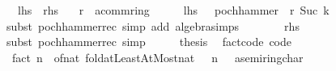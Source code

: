 \begin{isabellebody}
\ \ {\isacharparenleft}{\kern0pt}\ {\isachardoublequoteopen}{\isacharquery}{\kern0pt}lhs\ {\isacharequal}{\kern0pt}\ {\isacharquery}{\kern0pt}rhs{\isachardoublequoteclose}{\isacharparenright}{\kern0pt}\isanewline
\ \ \ r\ {\isacharcolon}{\kern0pt}{\isacharcolon}{\kern0pt}\ {\isachardoublequoteopen}{\isacharprime}{\kern0pt}a{\isacharcolon}{\kern0pt}{\isacharcolon}{\kern0pt}comm{\isacharunderscore}{\kern0pt}ring{\isacharunderscore}{\kern0pt}{}{\isachardoublequoteclose}\isanewline
%
\isadelimproof
%
\endisadelimproof
%
\isatagproof
{}\isamarkupfalse%
\ {\isacharminus}{\kern0pt}\isanewline
\ \ \isamarkupfalse%
\ {\isachardoublequoteopen}{\isacharquery}{\kern0pt}lhs\ {\isacharequal}{\kern0pt}\ {\isacharminus}{\kern0pt}\ pochhammer\ {\isacharparenleft}{\kern0pt}{\isacharminus}{\kern0pt}\ r{\isacharparenright}{\kern0pt}\ {\isacharparenleft}{\kern0pt}Suc\ k{\isacharparenright}{\kern0pt}{\isachardoublequoteclose}\isanewline
\ \ \ \ \isamarkupfalse%
\ {\isacharparenleft}{\kern0pt}subst\ pochhammer{\isacharunderscore}{\kern0pt}rec{\isacharprime}{\kern0pt}{\isacharparenright}{\kern0pt}\ {\isacharparenleft}{\kern0pt}simp\ add{\isacharcolon}{\kern0pt}\ algebra{\isacharunderscore}{\kern0pt}simps{\isacharparenright}{\kern0pt}\isanewline
\ \ \isamarkupfalse%
\ \isamarkupfalse%
\ {\isachardoublequoteopen}{\isasymdots}\ {\isacharequal}{\kern0pt}\ {\isacharquery}{\kern0pt}rhs{\isachardoublequoteclose}\isanewline
\ \ \ \ \isamarkupfalse%
\ {\isacharparenleft}{\kern0pt}subst\ pochhammer{\isacharunderscore}{\kern0pt}rec{\isacharparenright}{\kern0pt}\ simp\isanewline
\ \ \isamarkupfalse%
\ \isamarkupfalse%
\ {\isacharquery}{\kern0pt}thesis\ \isacommand{{\isachardot}{\kern0pt}}\isamarkupfalse%
\isanewline
{}\isamarkupfalse%
%
\endisatagproof
{\isafoldproof}%
%
\isadelimproof
%
\endisadelimproof
%
\isadelimdocument
%
\endisadelimdocument
%
\isatagdocument
%
\isamarkuptrue%
%
\endisatagdocument
{\isafolddocument}%
%
\isadelimdocument
%
\endisadelimdocument
{}\isamarkupfalse%
\ fact{\isacharunderscore}{\kern0pt}code\ {\isacharbrackleft}{\kern0pt}code{\isacharbrackright}{\kern0pt}{\isacharcolon}{\kern0pt}\isanewline
\ \ {\isachardoublequoteopen}fact\ n\ {\isacharequal}{\kern0pt}\ {\isacharparenleft}{\kern0pt}of{\isacharunderscore}{\kern0pt}nat\ {\isacharparenleft}{\kern0pt}fold{\isacharunderscore}{\kern0pt}atLeastAtMost{\isacharunderscore}{\kern0pt}nat\ {\isacharparenleft}{\kern0pt}{\isacharparenleft}{\kern0pt}{\isacharasterisk}{\kern0pt}{\isacharparenright}{\kern0pt}{\isacharparenright}{\kern0pt}\ {}\ n\ {}{\isacharparenright}{\kern0pt}\ {\isacharcolon}{\kern0pt}{\isacharcolon}{\kern0pt}\ {\isacharprime}{\kern0pt}a{\isacharcolon}{\kern0pt}{\isacharcolon}{\kern0pt}semiring{\isacharunderscore}{\kern0pt}char{\isacharunderscore}{\kern0pt}{}{\isacharparenright}{\kern0pt}{\isachardoublequoteclose}\isanewline

\end{isabellebody}
